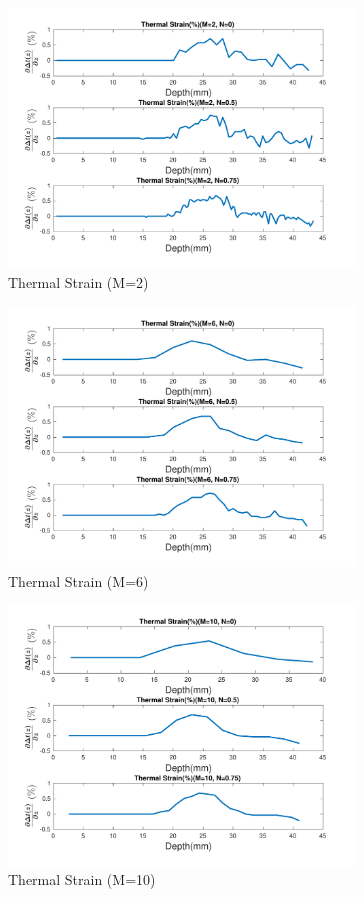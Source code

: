 \documentclass{article}
\begin{document}
\begin{figure}[H]
    \centering
    \includegraphics[width=0.82\textwidth]{src/strain_2.pdf}
    \caption{Thermal Strain (M=2)}
    \label{fig:strain-2}
\end{figure}
\begin{figure}[H]
    \centering
    \includegraphics[width=0.82\textwidth]{src/strain_6.pdf}
    \caption{Thermal Strain (M=6)}
    \label{fig:strain-6}
\end{figure}
\begin{figure}[H]
    \centering
    \includegraphics[width=0.82\textwidth]{src/strain_10.pdf}
    \caption{Thermal Strain (M=10)}
    \label{fig:strain-10}
\end{figure}
\end{document}
